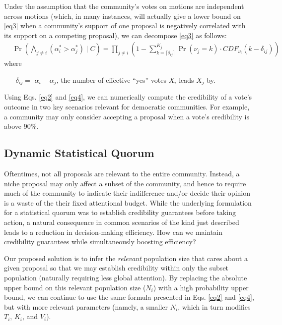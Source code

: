 \documentclass[format=acmsmall, review=true, screen=true, anonymous=true]{acmart}
\begin{document}
Under the assumption that the community's votes on motions are independent across motions (which, in many instances, will actually give a lower bound on \eqref{eq3} when a community's support of one proposal is negatively correlated with its support on a competing proposal), we can decompose \eqref{eq3} as follows:
\begin{align}\label{eq5}
& \Pr\left(\bigwedge_{j \neq i} (\alpha^*_i > \alpha^*_j) \mid C\right) = \prod_{j \neq i}\left(1 - \sum_{k=\lceil\delta_{ij}\rceil}^{K_j} \Pr(\nu_j = k) \cdot {CDF}_{\nu_i}(k-\delta_{ij}) \right)
\end{align}
where
\begin{itemize}
\item[$\delta_{ij} = $] $\alpha_i - \alpha_j$, the number of effective ``yes'' votes $X_i$ leads $X_j$ by.
\end{itemize}

Using Eqs. \eqref{eq2} and \eqref{eq4}, we can numerically compute the credibility of a vote's outcome in two key scenarios relevant for democratic communities.  For example, a community may only consider accepting a proposal when a vote's credibility is above $90\%$.

\subsection{Dynamic Statistical Quorum}
Oftentimes, not all proposals are relevant to the entire community.  Instead, a niche proposal may only affect a subset of the community, and hence to require much of the community to indicate their indifference and/or decide their opinion is a waste of the their fixed attentional budget.  While the underlying formulation for a statistical quorum was to establish credibility guarantees before taking action, a natural consequence in common scenarios of the kind just described leads to a reduction in decision-making efficiency.  How can we maintain credibility guarantees while simultaneously boosting efficiency?

Our proposed solution is to infer the \textit{relevant} population size that cares about a given proposal so that we may establish credibility within only the subset population (naturally requiring less global attention).  By replacing the absolute upper bound on this relevant population size ($N_i$) with a high probability upper bound, we can continue to use the same formula presented in Eqs. \eqref{eq2} and \eqref{eq4}, but with more relevant parameters (namely, a smaller $N_i$, which in turn modifies $T_i$, $K_i$, and $V_i$).
\end{document}
